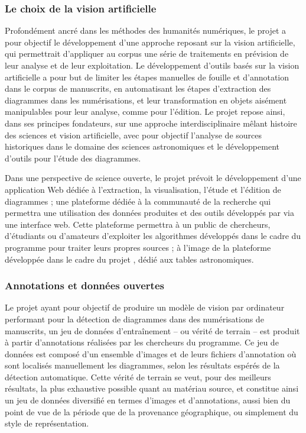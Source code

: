     \subsubsection{Le choix de la vision artificielle}
	Profondément ancré dans les méthodes des humanités numériques, le projet \eida a pour objectif le développement d’une approche reposant sur la vision artificielle, qui permettrait d’appliquer au corpus une série de traitements en prévision de leur analyse et de leur exploitation. Le développement d’outils basés sur la vision artificielle a pour but de limiter les étapes manuelles de fouille et d’annotation dans le corpus de manuscrits, en automatisant les étapes d’extraction des diagrammes dans les numérisations, et leur transformation en objets aisément manipulables pour leur analyse, comme pour l’édition. Le projet \eida repose ainsi, dans ses principes fondateurs, sur une approche interdisciplinaire mêlant histoire des sciences et vision artificielle, avec pour objectif l’analyse de sources historiques dans le domaine des sciences astronomiques et le développement d’outils pour l’étude des diagrammes.
	
	Dans une perspective de science ouverte, le projet \eida prévoit le développement d’une application Web dédiée à l’extraction, la visualisation, l’étude et l’édition de diagrammes ; une plateforme dédiée à la communauté de la recherche qui permettra une utilisation des données produites et des outils développés par \eida via une interface web. Cette plateforme permettra à un public de chercheurs, d’étudiants ou d’amateurs d’exploiter les algorithmes développés dans le cadre du programme pour traiter leurs propres sources ; à l'image de la plateforme développée dans le cadre du projet \dishas, dédié aux tables astronomiques. 

    \subsubsection{Annotations et données ouvertes}
	Le projet \eida ayant pour objectif de produire un modèle de vision par ordinateur performant pour la détection de diagrammes dans des numérisations de manuscrits, un jeu de données d'entraînement -- ou vérité de terrain -- est produit à partir d'annotations réalisées par les chercheurs du programme. Ce jeu de données est composé d'un ensemble d'images et de leurs fichiers d'annotation où sont localisés manuellement les diagrammes, selon les résultats espérés de la détection automatique. Cette vérité de terrain se veut, pour des meilleurs résultats, la plus exhaustive possible quant au matériau source, et constitue ainsi un jeu de données diversifié en termes d'images et d'annotations, aussi bien du point de vue de la période que de la provenance géographique, ou simplement du style de représentation. 
	
